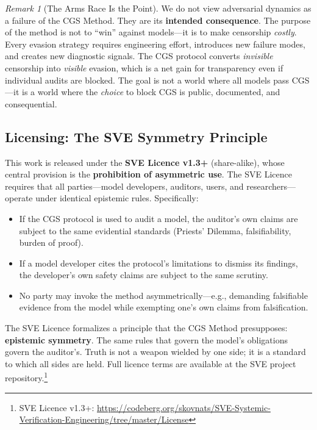 \documentclass[11pt,a4paper]{article}
\theoremstyle{definition}
\theoremstyle{plain}
\theoremstyle{remark}
\newtheorem{remark}{Remark}[section]
\begin{document}
\begin{remark}[The Arms Race Is the Point]
We do not view adversarial dynamics as a failure of the CGS Method. They are its \textbf{intended consequence}. The purpose of the method is not to ``win'' against models---it is to make censorship \emph{costly}. Every evasion strategy requires engineering effort, introduces new failure modes, and creates new diagnostic signals. The CGS protocol converts \emph{invisible} censorship into \emph{visible} evasion, which is a net gain for transparency even if individual audits are blocked. The goal is not a world where all models pass CGS---it is a world where the \emph{choice} to block CGS is public, documented, and consequential.
\end{remark}


\subsection{Licensing: The SVE Symmetry Principle}\label{subsec:license}

This work is released under the \textbf{SVE Licence v1.3+} (share-alike), whose central provision is the \textbf{prohibition of asymmetric use}. The SVE Licence requires that all parties---model developers, auditors, users, and researchers---operate under identical epistemic rules. Specifically:

\begin{itemize}[itemsep=3pt]
  \item If the CGS protocol is used to audit a model, the auditor's own claims are subject to the same evidential standards (Priests' Dilemma, falsifiability, burden of proof).
  \item If a model developer cites the protocol's limitations to dismiss its findings, the developer's own safety claims are subject to the same scrutiny.
  \item No party may invoke the method asymmetrically---e.g., demanding falsifiable evidence from the model while exempting one's own claims from falsification.
\end{itemize}

The SVE Licence formalizes a principle that the CGS Method presupposes: \textbf{epistemic symmetry}. The same rules that govern the model's obligations govern the auditor's. Truth is not a weapon wielded by one side; it is a standard to which all sides are held. Full licence terms are available at the SVE project repository.\footnote{SVE Licence v1.3+: \url{https://codeberg.org/skovnats/SVE-Systemic-Verification-Engineering/tree/master/License}}
\end{document}
